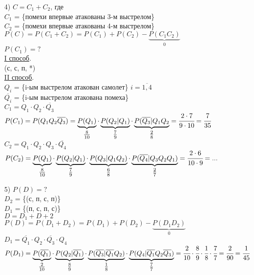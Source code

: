 \begin{enumerate}
\item[4)] $C = C_1 + C_2$, где \\
$C_1$ = \{помехи впервые атакованы 3-м выстрелом\} \\
$C_2$ = \{помехи впервые атакованы 4-м выстрелом\} \\
$P(C) = P(C_1 + C_2) = P(C_1) + P(C_2) - \underbrace{P(C_1 C_2)}_{0}$ \\
$P(C_1) = ?$ \\
\underline{I способ}. \\
(с, с, п, *) \\
\underline{II способ}. \\
$Q_i$ = \{i-ым выстрелом атакован самолет\} $i = \overline{1,4}$ \\
$\overline{Q_i}$ = \{i-ым выстрелом атакована помеха\} \\
$C_1 = Q_1 \cdot Q_2 \cdot \overline{Q_3}$ \\
$P(C_1) = P(Q_1 Q_2 \overline{Q_3}) = \underbrace{P(Q_1)}_{\tfrac{8}{10}} \cdot \underbrace{P(Q_2|Q_1)}_{\tfrac{7}{9}} \cdot \underbrace{P(\overline{Q_3}|Q_1 Q_2}_{\tfrac{2}{8}} = \cfrac{2 \cdot 7}{9 \cdot 10} = \cfrac{7}{35}$ \\

$C_2 = Q_1 \cdot Q_2 \cdot Q_3 \cdot \overline{Q_4}$ \\
$P(C_2) = \underbrace{P(Q_1)}_{\tfrac{8}{10}} \cdot \underbrace{P(Q_2|Q_1)}_{\tfrac{7}{9}} \cdot \underbrace{P(Q_3|Q_1 Q_2)}_{\tfrac{6}{8}} \cdot \underbrace{P(\overline{Q_4}|Q_3 Q_2 Q_1)}_{\tfrac{2}{7}} = \cfrac{2 \cdot 6}{10 \cdot 9} = ...$ \\

\item[5)] $P(D) = ?$ \\
$D_2$ = \{(с, п, с, п)\} \\
$D_1$ = \{(п, с, п, с)\} \\
$D = D_1 + D+2$ \\
$P(D) = P(D_1 + D_2) = P(D_1) + P(D_2) - \underbrace{P(D_1 D_2)}_{0}$ \\

$D_1 = \overline{Q_1} \cdot Q_2 \cdot \overline{Q_3} \cdot Q_4$ \\
$P(D_1) = \underbrace{P(\overline{Q_1})}_{\tfrac{2}{10}} \cdot \underbrace{P(Q_2|\overline{Q_1})}_{\tfrac{8}{9}} \cdot \underbrace{P(\overline{Q_3}|\overline{Q_1} Q_2)}_{\tfrac{1}{8}} \cdot \underbrace{P(Q_4|\overline{Q_1} Q_2 \overline{Q_3})}_{\tfrac{7}{7}} = \cfrac{2}{10} \cdot \cfrac{8}{9} \cdot \cfrac{1}{8} \cdot \cfrac{7}{7} = \cfrac{2}{90} = \cfrac{1}{45}$ \\


\end{enumerate}
